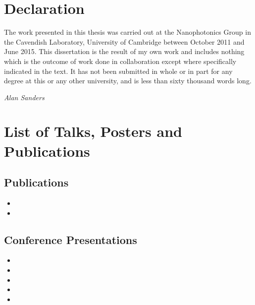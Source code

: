\documentclass[12pt, a4paper, oneside]{book}
\begin{document}

\section*{Declaration}
The work presented in this thesis was carried out at the Nanophotonics Group in the Cavendish Laboratory, University of Cambridge between October 2011 and June 2015. This dissertation is the result of my own work and includes nothing which is the outcome of work done in collaboration except where specifically indicated in the text. It has not been submitted in whole or in part for any degree at this or any other university, and is less than sixty thousand words long.

{\flushright\emph{Alan Sanders}\par}

\section*{List of Talks, Posters and Publications}
\subsection*{Publications}
\begin{itemize}
\item {}
\item {}
\end{itemize}

\subsection*{Conference Presentations}
\begin{itemize}
\item {}
\item {}
\item {}
\item {}
\item {}
\end{itemize}
\end{document}
